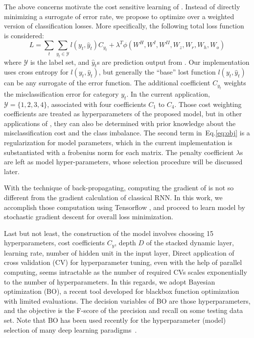 The above concerns motivate the cost sensitive learning of \modelname.
Instead of directly minimizing a surrogate of error rate, we propose to optimize over a weighted version of classification losses.
More specifically, the following total loss function is considered:
\begin{equation}
\label{eq:obj}
L = \sum_{t} \sum_{y_t \in \mathcal{Y}} l(y_t,\hat{y}_t)C_{y_t} + \lambda^T\phi (W^H,W^I,W^{II},W_z,W_r,W_h,W_o)
\end{equation}
where $\mathcal{Y}$ is the label set, and $\hat{y}_t$s are prediction output from \modelname.
Our implementation uses cross entropy for $l(y_t,\hat{y}_t)$, but generally the ``base'' lost function $l(y_t,\hat{y}_t)$ can be any surrogate of the error function.
The additional coefficient $C_{y_t}$ weights the misclassification error for category $y_t$.
In the current application, $\mathcal{Y} = \{1,2,3,4\}$, associated with four coefficients $C_1$ to $C_4$.
Those cost weighting coefficients are treated as hyperparameters of the proposed model, but in other applications of \modelname, they can also be determined with prior knowledge about the misclassification cost and the class imbalance. The second term in~Eq.\ref{eq:obj} is a regularization for model parameters, which in the current implementation is substantiated with a frobenius norm for each matrix. The penalty coefficient $\lambda$s are left as model hyper-parameters, whose selection procedure will be discussed later.

With the technique of back-propagating, computing the gradient of \modelname is not so different from the gradient calculation of classical RNN.
In this work, we accomplish those computation using Tensorflow \cite{bib:Tensorflow}, and proceed to learn \modelname model by stochastic gradient descent for overall loss minimization.

Last but not least, the construction of the \modelname model involves choosing 15 hyperparameters, \eg cost coefficients $C_{y}$, depth $D$ of the stacked dynamic layer, learning rate, number of hidden unit in the input layer, \etc
Direct application of cross validation (CV) for hyperparameter tuning, even with the help of parallel computing, seems intractable as the number of required CVs scales exponentially to the number of hyperparameters.
In this regards, we adopt Bayesian optimization (BO), a recent tool developed for blackbox function optimization with limited evaluations.
The decision variables of BO are those hyperparameters, and the objective is the F-score of the precision and recall on some testing data set.
Note that BO has been used recently for the hyperparameter (model) selection of many deep learning paradigms~\cite{snoek2012practical}.




